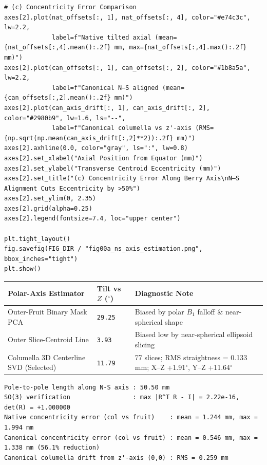 \documentclass[10pt,a4paper]{article}
\renewcommand{\_}{\origunderscore\allowbreak}
\begin{document}
\begin{codebox}
\begin{lstlisting}[style=pybmed]
# (c) Concentricity Error Comparison
axes[2].plot(nat_offsets[:, 1], nat_offsets[:, 4], color="#e74c3c", lw=2.2,
             label=f"Native tilted axial (mean={nat_offsets[:,4].mean():.2f} mm, max={nat_offsets[:,4].max():.2f} mm)")
axes[2].plot(can_offsets[:, 1], can_offsets[:, 2], color="#1b8a5a", lw=2.2,
             label=f"Canonical N–S aligned (mean={can_offsets[:,2].mean():.2f} mm)")
axes[2].plot(can_axis_drift[:, 1], can_axis_drift[:, 2], color="#2980b9", lw=1.6, ls="--",
             label=f"Canonical columella vs z'-axis (RMS={np.sqrt(np.mean(can_axis_drift[:,2]**2)):.2f} mm)")
axes[2].axhline(0.0, color="gray", ls=":", lw=0.8)
axes[2].set_xlabel("Axial Position from Equator (mm)")
axes[2].set_ylabel("Transverse Centroid Eccentricity (mm)")
axes[2].set_title("(c) Concentricity Error Along Berry Axis\nN–S Alignment Cuts Eccentricity by >50%")
axes[2].set_ylim(0, 2.35)
axes[2].grid(alpha=0.25)
axes[2].legend(fontsize=7.4, loc="upper center")

plt.tight_layout()
fig.savefig(FIG_DIR / "fig00a_ns_axis_estimation.png", bbox_inches="tight")
plt.show()
\end{lstlisting}
\end{codebox}
\begin{outbox}
{\scriptsize
\setlength{\tabcolsep}{4pt}
\renewcommand{\arraystretch}{1.16}
\begin{tabularx}{\linewidth}{L{5.3cm} R{2.1cm} Y}
\toprule
{}\textbf{Polar-Axis Estimator} & \textbf{Tilt vs $Z$ ($^\circ$)} & \textbf{Diagnostic Note} \\
\midrule
Outer-Fruit Binary Mask PCA & \texttt{29.25} & Biased by polar $B_1$ falloff \& near-spherical shape \\
Outer Slice-Centroid Line & \texttt{3.93} & Biased low by near-spherical ellipsoid slicing \\
Columella 3D Centerline SVD (Selected) & \texttt{11.79} & 77 slices; RMS straightness = 0.133\,mm; X--Z +1.91$^\circ$, Y--Z +11.64$^\circ$ \\
\bottomrule
\end{tabularx}
}
\vspace{3pt}
\begin{lstlisting}[style=outbmed]
Pole-to-pole length along N-S axis : 50.50 mm
SO(3) verification                 : max |R^T R - I| = 2.22e-16, det(R) = +1.000000
Native concentricity error (col vs fruit)    : mean = 1.244 mm, max = 1.994 mm
Canonical concentricity error (col vs fruit) : mean = 0.546 mm, max = 1.338 mm (56.1% reduction)
Canonical columella drift from z'-axis (0,0) : RMS = 0.259 mm
\end{lstlisting}
\end{outbox}
\end{document}
